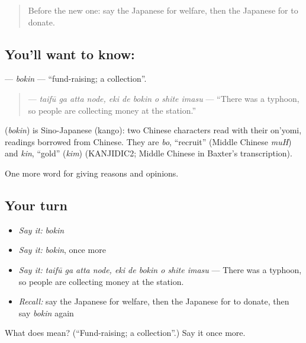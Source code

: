 \begin{quote}
Before the new one: say the Japanese for welfare, then the Japanese for to donate.
\end{quote}

\subsection*{You'll want to know: }
\textbf{} — \emph{bokin} — \textquotedblleft{}fund-raising; a collection\textquotedblright{}.

\begin{quote}
\textbf{   } — \emph{taifū ga atta node, eki de bokin o shite imasu} — \textquotedblleft{}There was a typhoon, so people are collecting money at the station.\textquotedblright{}
\end{quote}

\begin{cousinweb}
\textbf{} (\emph{bokin}) is Sino-Japanese (kango): two Chinese characters read with their on'yomi, readings borrowed from Chinese. They are \emph{bo}, \textquotedblleft{}recruit\textquotedblright{} (Middle Chinese \emph{muH}) and \emph{kin}, \textquotedblleft{}gold\textquotedblright{} (\emph{kim}) (KANJIDIC2; Middle Chinese in Baxter's transcription).
\end{cousinweb}

\begin{grammarlens}[title={What you've built}]
One more word for giving reasons and opinions.
\end{grammarlens}

\subsection*{Your turn}
\begin{itemize}
\raggedright
  \item \emph{Say it:} \emph{bokin}
  \item \emph{Say it:} \emph{bokin}, once more
  \item \emph{Say it:} \emph{taifū ga atta node, eki de bokin o shite imasu} — There was a typhoon, so people are collecting money at the station.
  \item \emph{Recall:} say the Japanese for welfare, then the Japanese for to donate, then say \emph{bokin} again
\end{itemize}

\begin{tcolorbox}[breakable,colback=teal!4,colframe=teal!35!black,title={Before you move on}]
What does  mean? (\textquotedblleft{}Fund-raising; a collection\textquotedblright{}.) Say it once more.
\end{tcolorbox}
